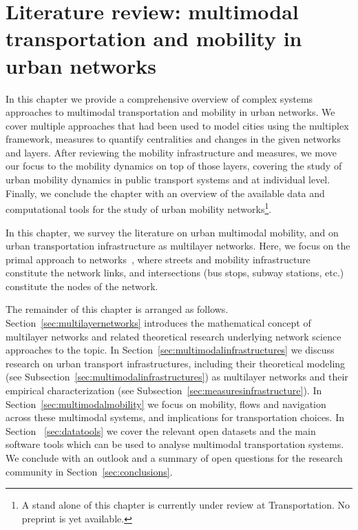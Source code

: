 \chapter[Literature review]{Literature review: multimodal transportation and mobility in urban networks}\label{ch:litReview}

In this chapter we provide a comprehensive overview of complex systems approaches to multimodal transportation and mobility in urban networks. We cover multiple approaches that had been used to model cities using the multiplex framework, measures to quantify centralities and changes in the given networks and layers. After reviewing the mobility infrastructure and measures, we move our focus to the mobility dynamics on top of those layers, covering the study of urban mobility dynamics in public transport systems and at individual level. Finally, we conclude the chapter with an overview of the available data and computational tools for the study of urban mobility networks\footnote{A stand alone of this chapter is currently under review at Transportation. No preprint is yet available.}.
\pagebreak


In this chapter, we survey the literature on urban multimodal mobility, and on urban transportation infrastructure as multilayer networks. Here, we focus on the primal approach to networks~\cite{porta2006primal}, where streets and mobility infrastructure constitute the network links, and intersections (bus stops, subway stations, etc.) constitute the nodes of the network.

The remainder of this chapter is arranged as follows. Section~\ref{sec:multilayernetworks} introduces the mathematical concept of multilayer networks and related theoretical research underlying network science approaches to the topic. In Section~\ref{sec:multimodalinfrastructures} we discuss research on urban transport infrastructures, including their theoretical modeling (see Subsection~\ref{sec:multimodalinfrastructures}) as multilayer networks and their empirical characterization (see Subsection~\ref{sec:measuresinfrastructure}). In Section~\ref{sec:multimodalmobility} we focus on mobility, flows and navigation across these multimodal systems, and implications for transportation choices. In Section ~\ref{sec:datatools} we cover the relevant open datasets and the main software tools which can be used to analyse multimodal transportation systems. We conclude with an outlook and a summary of open questions for the research community in Section~\ref{sec:conclusions}. 

